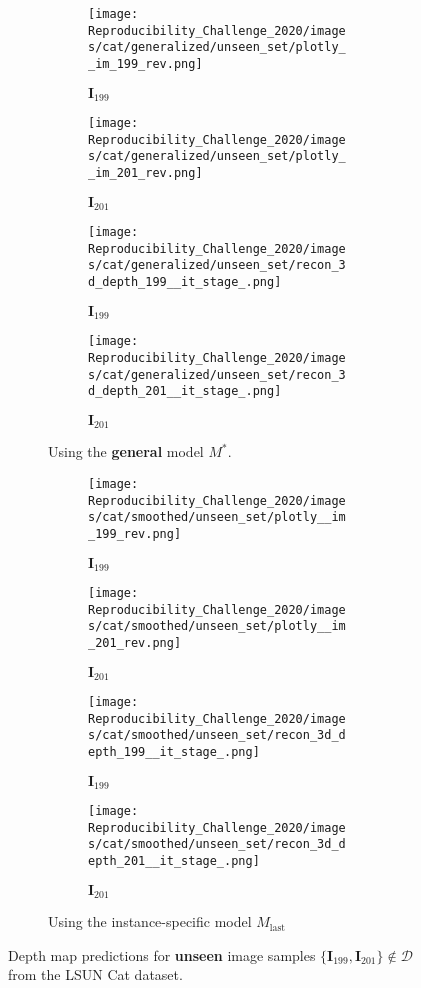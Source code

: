 \begin{figure}[!htb]
\begin{subfigure}{\textwidth}
    

\begin{subfigure}{0.24\textwidth}
    \centering
    \texttt{[image: Reproducibility\_Challenge\_2020/images/cat/generalized/unseen\_set/plotly\_\_im\_199\_rev.png]}
    \caption*{$\mathbf{I}_{199}$}
\end{subfigure}
\begin{subfigure}{0.24\textwidth}
    \centering
    \texttt{[image: Reproducibility\_Challenge\_2020/images/cat/generalized/unseen\_set/plotly\_\_im\_201\_rev.png]}
    \caption*{$\mathbf{I}_{201}$}
\end{subfigure}
\begin{subfigure}{0.24\textwidth}
    \centering
    \texttt{[image: Reproducibility\_Challenge\_2020/images/cat/generalized/unseen\_set/recon\_3d\_depth\_199\_\_it\_stage\_.png]}
    \caption*{$\mathbf{I}_{199}$}
\end{subfigure}
\begin{subfigure}{0.24\textwidth}
    \centering
    \texttt{[image: Reproducibility\_Challenge\_2020/images/cat/generalized/unseen\_set/recon\_3d\_depth\_201\_\_it\_stage\_.png]}
    \caption*{$\mathbf{I}_{201}$}
\end{subfigure}
    \caption{Using the \textbf{general} model $M^*$.}
\end{subfigure}

\begin{subfigure}{\textwidth}
\begin{subfigure}{0.24\textwidth}
    \centering
    \texttt{[image: Reproducibility\_Challenge\_2020/images/cat/smoothed/unseen\_set/plotly\_\_im\_199\_rev.png]}
    \caption*{$\mathbf{I}_{199}$}
\end{subfigure}
\begin{subfigure}{0.24\textwidth}
    \centering
    \texttt{[image: Reproducibility\_Challenge\_2020/images/cat/smoothed/unseen\_set/plotly\_\_im\_201\_rev.png]}
    \caption*{$\mathbf{I}_{201}$}
\end{subfigure}
\begin{subfigure}{0.24\textwidth}
    \centering
    \texttt{[image: Reproducibility\_Challenge\_2020/images/cat/smoothed/unseen\_set/recon\_3d\_depth\_199\_\_it\_stage\_.png]}
    \caption*{$\mathbf{I}_{199}$}
\end{subfigure}
\begin{subfigure}{0.24\textwidth}
    \centering
    \texttt{[image: Reproducibility\_Challenge\_2020/images/cat/smoothed/unseen\_set/recon\_3d\_depth\_201\_\_it\_stage\_.png]}
    \caption*{$\mathbf{I}_{201}$}
\end{subfigure}
\caption{Using the instance-specific model $M_{\textrm{last}}$}
\end{subfigure}
    \caption{Depth map predictions for \textbf{unseen} image samples $\{\mathbf{I}_{199}, \mathbf{I}_{201} \} \not\in \mathcal{D}$ from the LSUN Cat dataset.}
    \label{fig:gen_LSUN_Cat_test}
\end{figure}

